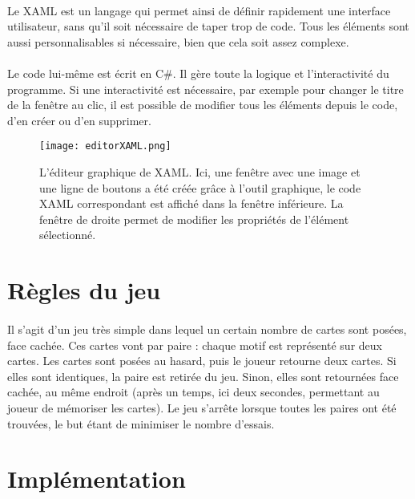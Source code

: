 \paragraph{}Le XAML est un langage qui permet ainsi de définir rapidement une interface utilisateur, sans qu'il soit nécessaire de taper trop de code. Tous les éléments sont aussi personnalisables si nécessaire, bien que cela soit assez complexe. 

\paragraph{}Le code lui-même est écrit en C\#. Il gère toute la logique et l'interactivité du programme. Si une interactivité est nécessaire, par exemple pour changer le titre de la fenêtre au clic, il est possible de modifier tous les éléments depuis le code, d'en créer ou d'en supprimer.

\begin{figure}[H]
	\centering
	\texttt{[image: editorXAML.png]}
	\caption{L'éditeur graphique de XAML. Ici, une fenêtre avec une image et une ligne de boutons a été créée grâce à l'outil graphique, le code XAML correspondant est affiché dans la fenêtre inférieure. La fenêtre de droite permet de modifier les propriétés de l'élément sélectionné.}
	\label{fig:editorXAML}
\end{figure}


\section{Règles du jeu}

\paragraph{}Il s'agit d'un jeu très simple dans lequel un certain nombre de cartes sont posées, face cachée. Ces cartes vont par paire : chaque motif est représenté sur deux cartes. Les cartes sont posées au hasard, puis le joueur retourne deux cartes. Si elles sont identiques, la paire est retirée du jeu. Sinon, elles sont retournées face cachée, au même endroit (après un temps, ici deux secondes, permettant au joueur de mémoriser les cartes). Le jeu s'arrête lorsque toutes les paires ont été trouvées, le but étant de minimiser le nombre d'essais.


\section{Implémentation}

